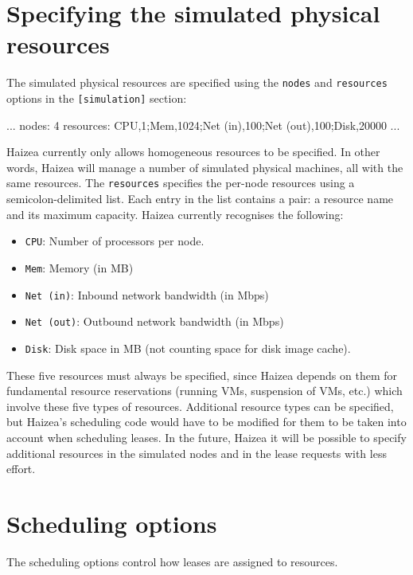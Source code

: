 \section{Specifying the simulated physical resources}

The simulated physical resources are specified using the \texttt{nodes} and \texttt{resources} options in the \texttt{[simulation]} section:

\begin{wideshellverbatim}
[simulation]
...
nodes: 4
resources: CPU,1;Mem,1024;Net (in),100;Net (out),100;Disk,20000
...
\end{wideshellverbatim}

Haizea currently only allows homogeneous resources to be specified. In other words, Haizea will manage a number of simulated physical machines, all with the same resources. The \texttt{resources} specifies the per-node resources using a semicolon-delimited list. Each entry in the list contains a pair: a resource name and its maximum capacity. Haizea currently recognises the following:

\begin{itemize}
\item \texttt{CPU}: Number of processors per node.
\item \texttt{Mem}: Memory (in MB)
\item \texttt{Net (in)}: Inbound network bandwidth (in Mbps) 
\item \texttt{Net (out)}: Outbound network bandwidth (in Mbps) 
\item \texttt{Disk}: Disk space in MB (not counting space for disk image cache).
\end{itemize}

These five resources must always be specified, since Haizea depends on them for fundamental resource reservations (running VMs, suspension of VMs, etc.) which involve these five types of resources. Additional resource types can be specified, but Haizea's scheduling code would have to be modified for them to be taken into account when scheduling leases. In the future, Haizea it will be possible to specify additional resources in the simulated nodes and in the lease requests with less effort.

\section{Scheduling options}

The scheduling options control how leases are assigned to resources.

